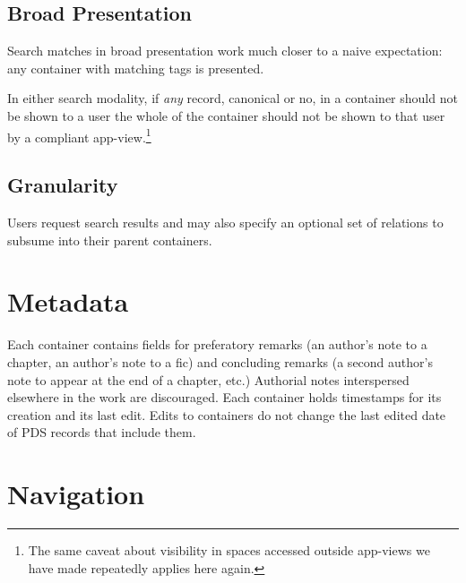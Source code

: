 \documentclass{amsart}
\theoremstyle{remark}
\begin{document}
\subsection{Broad Presentation}
Search matches in broad presentation work much closer to a naive expectation: any container with matching tags is presented. 

In either search modality, if \emph{any} record, canonical or no, in a container should not be shown to a user the whole of the container should not be shown to that user by a compliant app-view.\footnote{The same caveat about visibility in spaces accessed outside app-views we have made repeatedly applies here again.}

\subsection{Granularity}
Users request search results and may also specify an optional set of relations to subsume into their parent containers. 
%


\section{Metadata}
Each container contains fields for preferatory remarks (an author's note to a chapter, an author's note to a fic) and concluding remarks (a second author's note to appear at the end of a chapter, etc.) Authorial notes interspersed elsewhere in the work are discouraged. Each container holds timestamps for its creation and its last edit. Edits to containers do not change the last edited date of PDS records that include them.

\section{Navigation}
\end{document}
